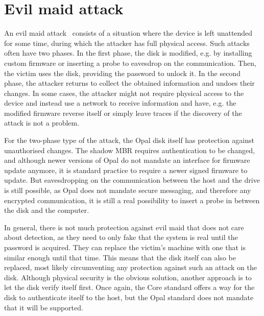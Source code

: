 


\section{Evil maid attack}

An evil maid attack~\cite{self_decrypting_risks,systematic_assessment_of_the_security} consists of a situation where the device is left unattended for some time, during which the attacker has full physical access. Such attacks often have two phases. In the first phase, the disk is modified, e.g. by installing custom firmware or inserting a probe to eavesdrop on the communication. Then, the victim uses the disk, providing the password to unlock it. In the second phase, the attacker returns to collect the obtained information and undoes their changes. In some cases, the attacker might not require physical access to the device and instead use a network to receive information and have, e.g. the modified firmware reverse itself or simply leave traces if the discovery of the attack is not a problem.

\REPLACEME

For the two-phase type of the attack, the Opal disk itself has protection against unauthorised changes. The shadow MBR requires authentication to be changed, and although newer versions of Opal do not mandate an interface for firmware update anymore, it is standard practice to require a newer signed firmware to update.
But eavesdropping on the communication between the host and the drive is still possible, as Opal does not mandate secure messaging, and therefore any encrypted communication, it is still a real possibility to insert a probe in between the disk and the computer.



In general, there is not much protection against evil maid that does not care about detection, as they need to only fake that the system is real until the password is acquired. They can replace the victim's machine with one that is similar enough until that time. This means that the disk itself can also be replaced, most likely circumventing any protection against such an attack on the disk.
Although physical security is the obvious solution, another approach is to let the disk verify itself first. Once again, the Core standard offers a way for the disk to authenticate itself to the host, but the Opal standard does not mandate that it will be supported.



